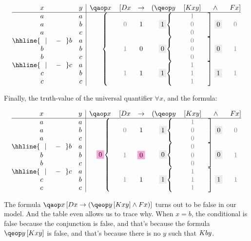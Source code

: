 \documentclass[PHIL101-Textbook.tex]{subfiles}
\begin{document}
 \[
	\begin{array}{@{}cc|ccccccc@{}}
	x & y & \qa x & [\atom D x & \eif & (\qe y & [\atom K {xy}] & \eand & \atom F x]\\ \hline
 a & a &\brax{9}{\ \ }&&&\brax{3}{\GT}&\gT&\braz{3}{\ \GF}&\\
	  a & b &&\gF&\vT&&\gF&&\gF\\
	  a & c &&&&&\gF&&\\\hhline{~~|~~~~-~~}
	  b & a &&&&\brax{3}{\GF}&\gF&\braz{3}{\ \GF}&\\
	  b & b &&\gT&\vF&&\gF&&\gT\\
	  b & c &&&&&\gF&&\\\hhline{~~|~~~~-~~}
	  c & a &&&&\brax{3}{\GT}&\gT&\braz{3}{\ \GT}&\\
	  c & b &&\gT&\vT&&\gT&&\gT\\
	  c & c &&&&&\gT&&\\
	\end{array}
  \]  


  \noindent Finally, the truth-value of the universal quantifier $\forall x$, and the formula:

 \[
	\begin{array}{@{}cc|ccccccc@{}}
	x & y & \qa x & [\atom D x & \eif & (\qe y & [\atom K {xy}] & \eand & \atom F x]\\ \hline
 a & a &\brax{9}{\ \FF}&&&\brax{3}{\GT}&\gT&\braz{3}{\ \GF}&\\
	  a & b &&\gF&\vT&&\gF&&\gF\\
	  a & c &&&&&\gF&&\\\hhline{~~|~~~~-~~}
	  b & a &&&&\brax{3}{\GF}&\gF&\braz{3}{\ \GF}&\\
	  b & b &&\gT&\FF&&\gF&&\gT\\
	  b & c &&&&&\gF&&\\\hhline{~~|~~~~-~~}
	  c & a &&&&\brax{3}{\GT}&\gT&\braz{3}{\ \GT}&\\
	  c & b &&\gT&\vT&&\gT&&\gT\\
	  c & c &&&&&\gT&&\\
	\end{array}
  \]  

  
The formula $\qab{x}{\atom D x \eif (\qeb{y}{\atom K{xy}} \eand \atom F x)}$ turns out to be false in our model. And the table even allows us to trace why. When $x = b$, the conditional is false because the conjunction is false, and that's because the formula $\qeb{y}{\atom K {xy}}$ is false, and that's because there is no $y$ such that $\mathord{K}{by}$.


\pagebreak  
\practiceproblems
\end{document}
